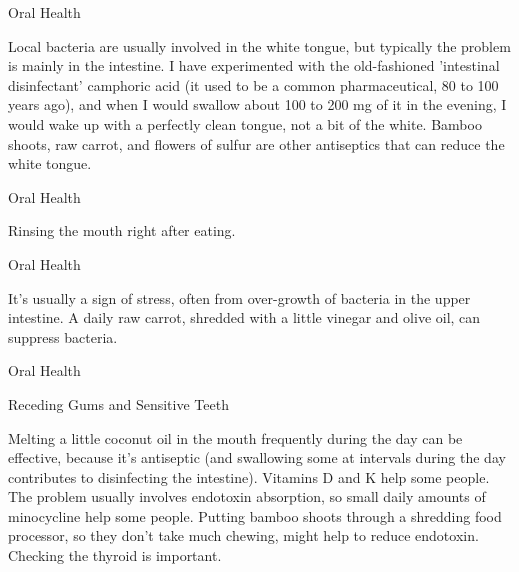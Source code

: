 \documentclass[11pt,oneside,openany,extrafontsizes]{memoir}
\begin{document}
\begin{standalonequote}{Oral Health}

    \begin{answer}
        Local bacteria are usually involved in the white tongue, but typically the problem is mainly in the intestine. I have experimented with the old-fashioned 'intestinal disinfectant' camphoric acid (it used to be a common pharmaceutical, 80 to 100 years ago), and when I would swallow about 100 to 200 mg of it in the evening, I would wake up with a perfectly clean tongue, not a bit of the white. Bamboo shoots, raw carrot, and flowers of sulfur are other antiseptics that can reduce the white tongue.
    \end{answer}
\end{standalonequote}

\begin{standalonequote}{Oral Health}

    \begin{answer}
        Rinsing the mouth right after eating.
    \end{answer}
\end{standalonequote}

\begin{standalonequote}{Oral Health}

    \begin{answer}
        It's usually a sign of stress, often from over-growth of bacteria in the upper intestine. A daily raw carrot, shredded with a little vinegar and olive oil, can suppress bacteria.
    \end{answer}
\end{standalonequote}

\begin{standalonequote}{Oral Health}
    \begin{note}
        Receding Gums and Sensitive Teeth
    \end{note}

    \begin{answer}
        Melting a little coconut oil in the mouth frequently during the day can be effective, because it's antiseptic (and swallowing some at intervals during the day contributes to disinfecting the intestine). Vitamins D and K help some people. The problem usually involves endotoxin absorption, so small daily amounts of minocycline help some people. Putting bamboo shoots through a shredding food processor, so they don't take much chewing, might help to reduce endotoxin. Checking the thyroid is important.
    \end{answer}
\end{standalonequote}
\end{document}
